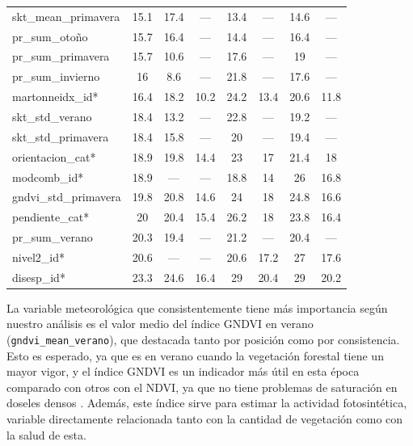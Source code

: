 \begin{table}[htbp]
\begin{tabular}{lccccccc}
    skt\_mean\_primavera & 15.1 & 17.4 & --- & 13.4 & --- & 14.6 & --- \\
    pr\_sum\_otoño & 15.7 & 16.4 & --- & 14.4 & --- & 16.4 & --- \\
    pr\_sum\_primavera & 15.7 & 10.6 & --- & 17.6 & --- & 19 & --- \\
    pr\_sum\_invierno & 16 & 8.6 & --- & 21.8 & --- & 17.6 & --- \\
    martonneidx\_id* & 16.4 & 18.2 & 10.2 & 24.2 & 13.4 & 20.6 & 11.8 \\
    skt\_std\_verano & 18.4 & 13.2 & --- & 22.8 & --- & 19.2 & --- \\
    skt\_std\_primavera & 18.4 & 15.8 & --- & 20 & --- & 19.4 & --- \\
    orientacion\_cat* & 18.9 & 19.8 & 14.4 & 23 & 17 & 21.4 & 18 \\
    modcomb\_id* & 18.9 & --- & --- & 18.8 & 14 & 26 & 16.8 \\
    gndvi\_std\_primavera & 19.8 & 20.8 & 14.6 & 24 & 18 & 24.8 & 16.6 \\
    pendiente\_cat* & 20 & 20.4 & 15.4 & 26.2 & 18 & 23.8 & 16.4 \\
    pr\_sum\_verano & 20.3 & 19.4 & --- & 21.2 & --- & 20.4 & --- \\
    nivel2\_id* & 20.6 & --- & --- & 20.6 & 17.2 & 27 & 17.6 \\
    disesp\_id* & 23.3 & 24.6 & 16.4 & 29 & 20.4 & 29 & 20.2 \\
    \bottomrule
  \end{tabular}
\end{table}

La variable meteorológica que consistentemente tiene más importancia según nuestro análisis es el valor medio del índice GNDVI en verano (\texttt{gndvi_mean_verano}), que destacada tanto por posición como por consistencia. Esto es esperado, ya que es en verano cuando la vegetación forestal tiene un mayor vigor, y el índice GNDVI es un indicador más útil en esta época comparado con otros con el NDVI, ya que no tiene problemas de saturación en doseles densos \cite{eos2025indices_vegetacion, ign_pnoa_lidar_tercera}. Además, este índice sirve para estimar la actividad fotosintética, variable directamente relacionada tanto con la cantidad de vegetación como con la salud de esta.


